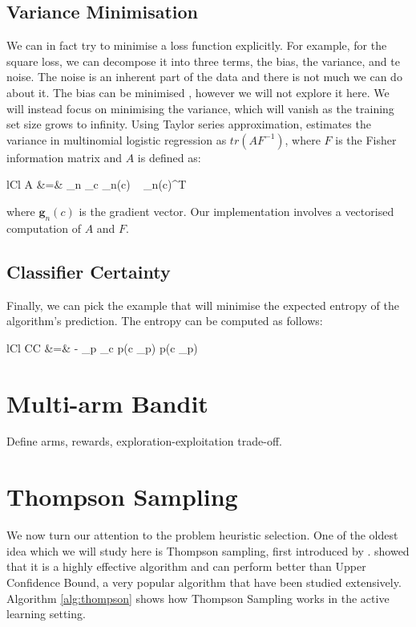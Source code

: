 \subsection{Variance Minimisation}
We can in fact try to minimise a loss function explicitly. For example, for the square loss,
we can decompose it into three terms, the bias, the variance, and te noise. The noise is an
inherent part of the data and there is not much we can do about it.
The bias can be minimised \cite{cohn97}, however
we will not explore it here. We will instead focus on minimising the variance, which will
vanish as the training set size grows to infinity.
Using Taylor series approximation,  estimates the variance in multinomial logistic regression as $tr(AF^{-1})$, where $F$ is the Fisher information matrix and $A$ is defined as:
	\begin{IEEEeqnarray*}{lCl}
		A &=& \sum_n \sum_c _n(c) ~ _n(c)^T
	\end{IEEEeqnarray*}
where $\mathbf{g}_n(c)$ is the gradient vector. Our implementation involves a vectorised computation of $A$ and $F$.


\subsection{Classifier Certainty}
Finally, we can pick the example that will minimise the expected entropy of the algorithm's prediction. The entropy can be computed as follows:
	\begin{IEEEeqnarray*}{lCl}
		CC &=& - \sum_{p \in {}} \sum_c p(c \mid {}_p) \log p(c \mid {}_p)
	\end{IEEEeqnarray*}
	



\section{Multi-arm Bandit}

Define arms, rewards, exploration-exploitation trade-off.

\section{Thompson Sampling}
We now turn our attention to the problem heuristic selection.
 One of the oldest idea which we will
study here is Thompson sampling, first introduced by .
 showed that it is a highly effective algorithm and can perform better
than Upper Confidence Bound, a very popular algorithm that have been studied extensively.
Algorithm \ref{alg:thompson} shows how Thompson Sampling works in the active learning
setting.

